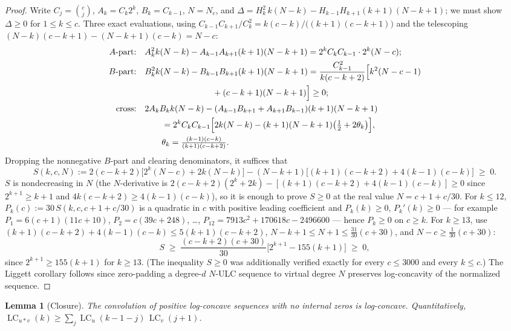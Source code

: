 \documentclass[11pt]{article}
\newtheorem{lemma}[theorem]{Lemma}
\theoremstyle{definition}
\DeclareMathOperator{\lc}{LC}
\begin{document}
\begin{proof}
Write $C_j=\binom cj$, $A_k=C_k2^k$, $B_k=C_{k-1}$, $N=N_c$, and
$\Delta=H_k^2\,k(N-k)-H_{k-1}H_{k+1}(k+1)(N-k+1)$; we must show
$\Delta\ge0$ for $1\le k\le c$.  Three exact evaluations, using
$C_{k-1}C_{k+1}/C_k^2=k(c-k)/\bigl((k+1)(c-k+1)\bigr)$ and the
telescoping $(N-k)(c-k+1)-(N-k+1)(c-k)=N-c$:
\begin{align*}
  A\text{-part:}\quad
  &A_k^2k(N-k)-A_{k-1}A_{k+1}(k+1)(N-k+1)
   =2^kC_kC_{k-1}\cdot2^k(N-c);\\
  B\text{-part:}\quad
  &B_k^2k(N-k)-B_{k-1}B_{k+1}(k+1)(N-k+1)
   =\frac{C_{k-1}^2}{k(c-k+2)}
   \Bigl[k^2(N-c-1)\\
  &\hspace{8em} +(c-k+1)(N-k+1)\Bigr]\ge0;\\
  \text{cross:}\quad
  &2A_kB_kk(N-k)-(A_{k-1}B_{k+1}+A_{k+1}B_{k-1})(k+1)(N-k+1)\\
  &\qquad=2^kC_kC_{k-1}
  \Bigl[2k(N-k)-(k+1)(N-k+1)\bigl(\tfrac12+2\theta_k\bigr)\Bigr],\\
  &\qquad\theta_k=\tfrac{(k-1)(c-k)}{(k+1)(c-k+2)}.
\end{align*}
Dropping the nonnegative $B$-part and clearing denominators, it
suffices that
\[
  S(k,c,N):=2(c-k+2)\bigl[2^k(N-c)+2k(N-k)\bigr]
  -(N-k+1)\bigl[(k+1)(c-k+2)+4(k-1)(c-k)\bigr]\;\ge\;0 .
\]
$S$ is nondecreasing in $N$ (the $N$-derivative is
$2(c-k+2)(2^k+2k)-[(k+1)(c-k+2)+4(k-1)(c-k)]\ge0$ since
$2^{k+1}\ge k+1$ and $4k(c-k+2)\ge4(k-1)(c-k)$), so it is enough to
prove $S\ge0$ at the real value $N=c+1+c/30$.  For $k\le12$,
$P_k(c):=30\,S(k,c,c+1+c/30)$ is a quadratic in $c$ with positive
leading coefficient and $P_k(k)\ge0$, $P_k'(k)\ge0$ --- for example
$P_1=6(c+1)(11c+10)$, $P_2=c(39c+248)$, \dots,
$P_{12}=7913c^2+170618c-2496600$ --- hence $P_k\ge0$ on $c\ge k$.
For $k\ge13$, use $(k+1)(c-k+2)+4(k-1)(c-k)\le5(k+1)(c-k+2)$,
$N-k+1\le N+1\le\tfrac{31}{30}(c+30)$, and
$N-c\ge\tfrac{1}{30}(c+30)$:
\[
  S\;\ge\;\frac{(c-k+2)(c+30)}{30}\bigl[2^{k+1}-155(k+1)\bigr]\;\ge\;0,
\]
since $2^{k+1}\ge155(k+1)$ for $k\ge13$.  (The inequality $S\ge0$ was
additionally verified exactly for every $c\le3000$ and every $k\le
c$.)  The Liggett corollary follows since zero-padding a degree-$d$
$N$-ULC sequence to virtual degree $N$ preserves log-concavity of the
normalized sequence.
\end{proof}

\begin{lemma}[Closure]\label{lem:a1}
The convolution of positive log-concave sequences with no internal
zeros is log-concave.  Quantitatively,
$\lc_{u*v}(k)\ge\sum_j\lc_u(k-1-j)\,\lc_v(j+1)$.
\end{lemma}
\end{document}
